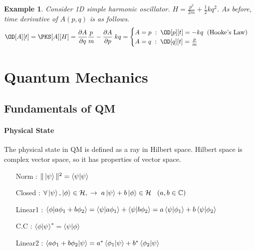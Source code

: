 \documentclass[final]{IEEEphot}
\newtheorem{example}{Example}[section]
\newcommand{\PD}[2]{\dfrac{\partial #1}{\partial #2}} %
\renewcommand{\H}{\mathcal{H}} %
\newcommand{\hket}[1][\psi]{\ket{#1}} %
\newcommand{\HS}{\hspace{0.3cm}} %
\newcommand{\VS}{\vspace{0.3cm}} %
\newcommand{\Com}{,\hspace{0.1cm}} %
\newcommand{\hs}{\hspace{0.1cm}} %
\newcommand{\vs}{\vspace{0.1cm}} %
\begin{document}
\begin{example}
 \normalfont
 Consider 1D simple harmonic oscillator.  $H = \frac{p^2}{2m} + \frac{1}{2}k q^2$. As before, time derivative of $A(p,q)$ is as follows.
 \begin{equation}
  \OD[A][t] = \PKS[A][H] = \PD{A}{q} \frac{p}{m} - \PD{A}{p} \hs kq=
  \begin{cases}
   A = p \hs : \hs \OD[p][t] = -kq \hs\hs \textnormal{(Hooke's Law)}\\
   A = q \hs : \hs \OD[q][t] = \frac{p}{m}
  \end{cases}
 \end{equation} 
\end{example}


\newpage

\section{Quantum Mechanics}

\VS

\subsection{Fundamentals of QM}
\paragraph{Physical State}

The physical state in QM is defined as a ray in Hilbert space. Hilbert space is complex vector space, so it has properties of vector space.

\begin{itemize}
 \item[Norm]: $\| \ket{\psi} \| ^2 = \braket{\psi | \psi}$
 \vs
 \item[Closed]: $\forall \hket, \ket{\phi} \in \H\Com \rightarrow \hs a\hket + b\ket{\phi} \in \H \HS (a,b\in\mathbb{C}) $
 \vs
 \item[Linear1]: $\braket{\phi | a\phi_1 + b\phi_2} = \braket{\psi | a\phi_1} + \braket{\psi|b\phi_2} = a\braket{\psi|\phi_1} + b\braket{\psi|\phi_2}$
 \vs
 \item[C.C]\footnotemark[1]: $\braket{\phi|\psi}^{*} = \braket{\psi|\phi}$
 \vs
 \item[Linear2]: $\braket{a\phi_1 + b\phi_2|\psi} = a^* \braket{\phi_1 | \psi} + b^*\braket{\phi_2|\psi}$ 
\end{itemize}

\VS
\end{document}
